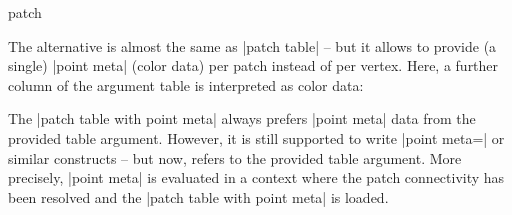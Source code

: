 {\begin{plottype}[/pgfplots]{patch}
\begin{pgfplotskeylist}
	The alternative  is almost the same as |patch table| -- but it allows to provide (a single) |point meta| (color data) per patch instead of per vertex. Here, a further column of the argument table is interpreted as color data:
\begin{codeexample}[]
\end{codeexample}
	\noindent The |patch table with point meta| always prefers |point meta| data from the provided table argument. However, it is still supported to write |point meta=\thisrow| or similar constructs -- but now,  refers to the provided table argument. More precisely, |point meta| is evaluated in a context where the patch connectivity has been resolved and the |patch table with point meta| is loaded.


\end{pgfplotskeylist}
\end{plottype}}

